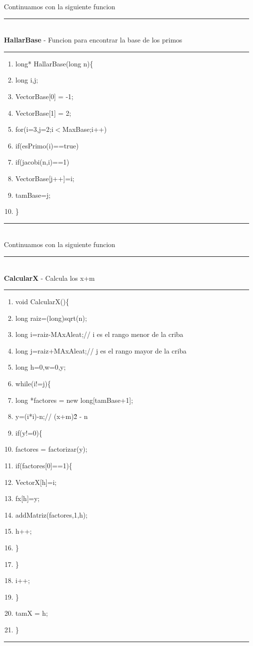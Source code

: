 \documentclass[11pt, conference]{IEEEtran}
\begin{document}
Continuamos con la siguiente funcion\\
\rule[0mm]{181mm}{0.1mm}\\
\textbf{HallarBase} - Funcion para encontrar la base de los primos\\
\rule[3mm]{181mm}{0.1mm}
\begin{enumerate}
	\item long* HallarBase(long n)\{
	\item \qquad long i,j;
	\item \qquad VectorBase[0] = -1;
	\item \qquad VectorBase[1] = 2;
	\item \qquad for(i=3,j=2;i$<$MaxBase;i++)
	\item \qquad\qquad if(esPrimo(i)==true)
	\item \qquad\qquad\qquad if(jacobi(n,i)==1)
	\item \qquad\qquad\qquad\qquad VectorBase[j++]=i;
	\item \qquad tamBase=j;
	\item \}
\end{enumerate}
\rule[3mm]{181mm}{0.1mm}\\


Continuamos con la siguiente funcion\\
\rule[0mm]{181mm}{0.1mm}\\
\textbf{CalcularX} - Calcula los x+m\\
\rule[3mm]{181mm}{0.1mm}
\begin{enumerate}
	\item void CalcularX()\{
	\item \qquad long raiz=(long)sqrt(n);
	\item \qquad long i=raiz-MAxAleat;// i es el rango menor de la criba
	\item \qquad long j=raiz+MAxAleat;// j es el rango mayor de la criba
	\item \qquad long h=0,w=0,y;
	\item \qquad while(i!=j)\{
	\item \qquad\qquad long *factores = new long[tamBase+1];
	\item \qquad\qquad y=(i*i)-n;// (x+m)\^2 - n
	\item \qquad\qquad if(y!=0)\{
	\item \qquad\qquad\qquad factores = factorizar(y);
	\item \qquad\qquad\qquad if(factores[0]==1)\{
	\item \qquad\qquad\qquad\qquad VectorX[h]=i;
	\item \qquad\qquad\qquad\qquad fx[h]=y;
	\item \qquad\qquad\qquad\qquad addMatriz(factores,1,h);
	\item \qquad\qquad\qquad\qquad h++;
	\item \qquad\qquad\qquad\}
	\item \qquad\qquad\}
	\item \qquad i++;
	\item \qquad\}
	\item \qquad tamX = h;
	\item\}
\end{enumerate}
\rule[3mm]{181mm}{0.1mm}\\
\end{document}
